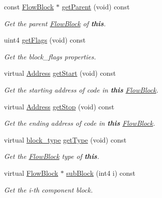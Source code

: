 \begin{DoxyCompactItemize}
const \mbox{\hyperlink{class_flow_block}{Flow\+Block}} $\ast$ \mbox{\hyperlink{class_flow_block_a1b03a3b5ba783d59b979f999686fc98b}{get\+Parent}} (void) const
\begin{DoxyCompactList}\small\item\em Get the parent \mbox{\hyperlink{class_flow_block}{Flow\+Block}} of {\bfseries{this}}. \end{DoxyCompactList}\item 
uint4 \mbox{\hyperlink{class_flow_block_accae5b9d68d2a541494dd736765ff812}{get\+Flags}} (void) const
\begin{DoxyCompactList}\small\item\em Get the block\+\_\+flags properties. \end{DoxyCompactList}\item 
virtual \mbox{\hyperlink{class_address}{Address}} \mbox{\hyperlink{class_flow_block_a4e2f7c4ce119ccb628c2609bc3a5b842}{get\+Start}} (void) const
\begin{DoxyCompactList}\small\item\em Get the starting address of code in {\bfseries{this}} \mbox{\hyperlink{class_flow_block}{Flow\+Block}}. \end{DoxyCompactList}\item 
virtual \mbox{\hyperlink{class_address}{Address}} \mbox{\hyperlink{class_flow_block_a5448927fcc62a519c92c8afcbf54e35f}{get\+Stop}} (void) const
\begin{DoxyCompactList}\small\item\em Get the ending address of code in {\bfseries{this}} \mbox{\hyperlink{class_flow_block}{Flow\+Block}}. \end{DoxyCompactList}\item 
virtual \mbox{\hyperlink{class_flow_block_a70df78390870fcdd51e31426ba6a193e}{block\+\_\+type}} \mbox{\hyperlink{class_flow_block_ae036068cc610d97a5461f9bcf75bd43d}{get\+Type}} (void) const
\begin{DoxyCompactList}\small\item\em Get the \mbox{\hyperlink{class_flow_block}{Flow\+Block}} type of {\bfseries{this}}. \end{DoxyCompactList}\item 
virtual \mbox{\hyperlink{class_flow_block}{Flow\+Block}} $\ast$ \mbox{\hyperlink{class_flow_block_a42070515fd8db6cc23916b359e259f4e}{sub\+Block}} (int4 i) const
\begin{DoxyCompactList}\small\item\em Get the i-\/th component block. \end{DoxyCompactList}\item 

\end{DoxyCompactItemize}

